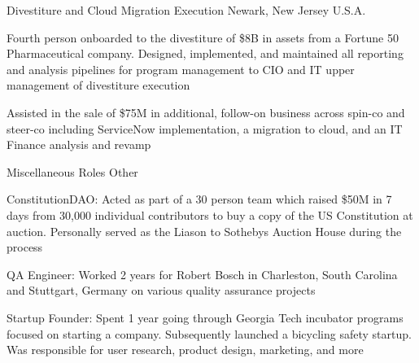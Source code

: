 \begin{cventries}
  \cventry
    {Divestiture and Cloud Migration Execution} %
    {} %
    {} %
    {Newark, New Jersey U.S.A.} %
    {
      \begin{cvitems} %
        \item {Fourth person onboarded to the divestiture of \$8B in assets from a Fortune 50 Pharmaceutical company. Designed, implemented, and maintained all reporting and analysis pipelines for program management to CIO and IT upper management of divestiture execution}
        \item {Assisted in the sale of \$75M in additional, follow-on business across spin-co and steer-co including ServiceNow implementation, a migration to cloud, and an IT Finance analysis and revamp}
      \end{cvitems}
    }

  \cventry
    {Miscellaneous Roles} %
    {Other} %
    {} %
    {} %
    {
      \begin{cvitems} %
        \item {ConstitutionDAO: Acted as part of a 30 person team which raised \$50M in 7 days from 30,000 individual contributors to buy a copy of the US Constitution at auction. Personally served as the Liason to Sothebys Auction House during the process}
        \item {QA Engineer: Worked 2 years for Robert Bosch in Charleston, South Carolina and Stuttgart, Germany on various quality assurance projects}
        \item {Startup Founder: Spent 1 year going through Georgia Tech incubator programs focused on starting a company. Subsequently launched a bicycling safety startup. Was responsible for user research, product design, marketing, and more}
      \end{cvitems}
    }

\end{cventries}
